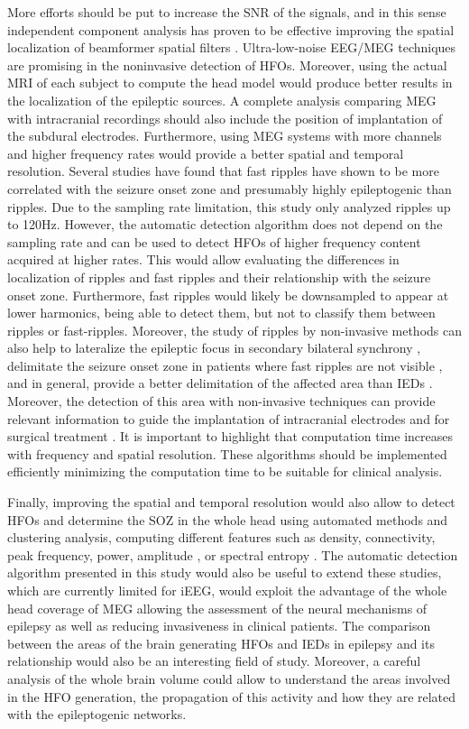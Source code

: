 More efforts should be put to increase the SNR of the signals, and in this sense independent component analysis has proven to be effective improving the spatial localization of beamformer spatial filters \citep{Fatima2013}. Ultra-low-noise EEG/MEG techniques \citep{Fedele2015} are promising in the noninvasive detection of HFOs. Moreover, using the actual MRI of each subject to compute the head model would produce better results in the localization of the epileptic sources. A complete analysis comparing MEG with intracranial recordings should also include the position of implantation of the subdural electrodes. 
Furthermore, using MEG systems with more channels and higher frequency rates would provide a better spatial and temporal resolution. Several studies have found that fast ripples have shown to be more correlated with the seizure onset zone and presumably highly epileptogenic \citep{vanKlink2014,Zijlmans2012,Haegelen2013,Jacobs2008} than ripples. Due to the sampling rate limitation, this study only analyzed ripples up to 120Hz. However, the automatic detection algorithm does not depend on the sampling rate and can be used to detect HFOs of higher frequency content acquired at higher rates. This would allow evaluating the differences in localization of ripples and fast ripples and their relationship with the seizure onset zone. Furthermore, fast ripples would likely be downsampled to appear at lower harmonics, being able to detect them, but not to classify them between ripples or fast-ripples. Moreover, the study of ripples by non-invasive methods can also help to lateralize the epileptic focus in secondary bilateral synchrony \citep{Pizzo2016}, delimitate the seizure onset zone in patients where fast ripples are not visible \citep{vanKlink2014}, and in general, provide a better delimitation of the affected area than IEDs \citep{Jacobs2008}. Moreover, the detection of this area with non-invasive techniques can provide relevant information to guide the implantation of intracranial electrodes and for surgical treatment \citep{vonEllenrieder2016}. It is important to highlight that computation time increases with frequency and spatial resolution. These algorithms should be implemented efficiently minimizing the computation time to be suitable for clinical analysis. 

Finally, improving the spatial and temporal resolution would also allow to detect HFOs and determine the SOZ in the whole head using automated methods and clustering analysis, computing different features such as density, connectivity, peak frequency, power, amplitude \citep{Modur2015},  or spectral entropy \citep{Liu2016}. The automatic detection algorithm presented in this study would also be useful to extend these studies, which are currently limited for iEEG, would exploit the advantage of the whole head coverage of MEG allowing the assessment of the neural mechanisms of epilepsy as well as reducing invasiveness in clinical patients. The comparison between the areas of the brain generating HFOs and IEDs in epilepsy and its relationship would also be an interesting field of study. Moreover, a careful analysis of the whole brain volume could allow to understand the areas involved in the HFO generation, the propagation of this activity and how they are related with the epileptogenic networks. 


